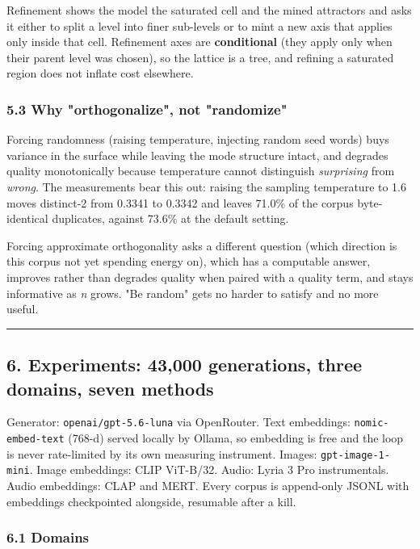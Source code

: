 \documentclass[
  11pt,
]{article}
\theoremstyle{plain}
\theoremstyle{definition}
\begin{document}
Refinement shows the model the saturated cell and the mined attractors
and asks it either to split a level into finer sub-levels or to mint a
new axis that applies only inside that cell. Refinement axes are
\textbf{conditional} (they apply only when their parent level was
chosen), so the lattice is a tree, and refining a saturated region does
not inflate cost elsewhere.

\subsubsection{5.3 Why "orthogonalize", not
"randomize"}\label{53-why-orthogonalize-not-randomize}

Forcing randomness (raising temperature, injecting random seed words)
buys variance in the surface while leaving the mode structure intact,
and degrades quality monotonically because temperature cannot
distinguish \emph{surprising} from \emph{wrong}. The measurements bear
this out: raising the sampling temperature to 1.6 moves distinct-2 from
0.3341 to 0.3342 and leaves 71.0\% of the corpus byte-identical
duplicates, against 73.6\% at the default setting.

Forcing approximate orthogonality asks a different question (which
direction is this corpus not yet spending energy on), which has a
computable answer, improves rather than degrades quality when paired
with a quality term, and stays informative as \emph{n} grows. "Be
random" gets no harder to satisfy and no more useful.

\begin{center}\rule{0.5\linewidth}{0.5pt}\end{center}

\subsection{6. Experiments: 43,000 generations, three domains, seven
methods}\label{6-experiments-43000-generations-three-domains-seven-methods}

Generator: \texttt{openai/gpt-5.6-luna} via OpenRouter. Text embeddings:
\texttt{nomic-embed-text} (768-d) served locally by Ollama, so embedding
is free and the loop is never rate-limited by its own measuring
instrument. Images: \texttt{gpt-image-1-mini}. Image embeddings: CLIP
ViT-B/32. Audio: Lyria 3 Pro instrumentals. Audio embeddings: CLAP and
MERT. Every corpus is append-only JSONL with embeddings checkpointed
alongside, resumable after a kill.

\subsubsection{6.1 Domains}\label{61-domains}
\end{document}

